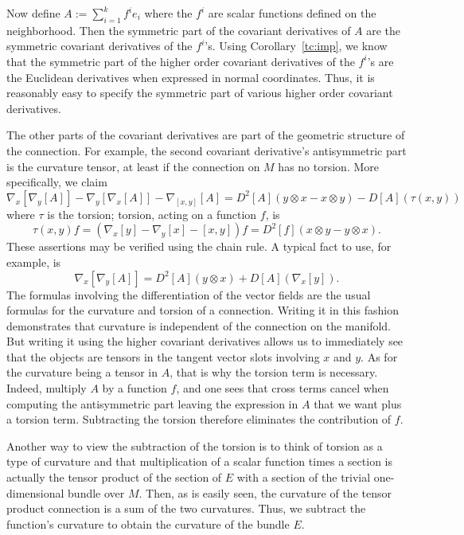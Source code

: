 \documentclass[11pt]{article}
\theoremstyle{remark}
\begin{document}
Now define $A := \sum_{i=1}^k f^i e_i$ where the $f^i$ are
scalar functions defined on the neighborhood. Then the symmetric part
of the covariant
derivatives of $A$ are the symmetric covariant derivatives of the $f^i$'s. 
Using Corollary~{\ref{tc:imp}}, we know that the symmetric part of the
higher order covariant derivatives of the $f^i$'s are  the
Euclidean derivatives when expressed in 
 normal coordinates. Thus, it is reasonably
easy to specify the symmetric part of various higher order covariant
derivatives. 

The other parts of the covariant derivatives are part of the geometric
structure of the connection. For example, the second covariant
derivative's antisymmetric part is the curvature tensor, at least if
the connection on $M$ has no torsion. More specifically, we claim
\[
\ensuremath{{{\nabla}}_{x}^{}{[\ensuremath{{{\nabla}}_{y}^{}{[A]}}{}]}} - \ensuremath{{{\nabla}}_{y}^{}{[\ensuremath{{{\nabla}}_{x}^{}{[A]}}{}]}}
- \ensuremath{{{\nabla}}_{[x,y]}^{}{[A]}} 
=
D^2[A] (y\otimes x -x \otimes y) - D[A] (\tau(x, y))
\]
where $\tau$ is the torsion; torsion, acting on a function $f$, is 
\[
\tau(x,y)f = (\ensuremath{{{\nabla}}_{x}^{}{[y]}} - \ensuremath{{{\nabla}}_{y}^{}{[x]}} -[x,y])f 
= D^2[f](x\otimes y -y \otimes x).
\]
These assertions may be verified using the chain rule. A typical fact
to use, for example, is
\[
\ensuremath{{{\nabla}}_{x}^{}{[\ensuremath{{{\nabla}}_{y}^{}{[A]}}{}]}} =  
D^2 [A] (y \otimes x) + D[A](\ensuremath{{{\nabla}}_{x}^{}{[y]}}).
\]
The formulas involving the differentiation of the vector fields are
the usual formulas for the curvature and torsion of a
connection. Writing it in this fashion demonstrates that curvature is
independent of the connection on the manifold. But writing it using
the higher covariant derivatives allows us to immediately see that the
objects are tensors in the tangent vector slots involving $x$ and
$y$. As for the curvature being a tensor in $A$, that is why the
torsion term is necessary. Indeed, multiply $A$ by a function $f$, and
one sees that cross terms cancel when computing the antisymmetric part
leaving the expression in $A$ that we want plus a torsion
term. Subtracting the torsion therefore eliminates the contribution of
$f$. 

Another way to view the subtraction of the torsion
 is to think of torsion as a type of
curvature and that multiplication of a scalar function times a section
is actually the tensor product of the section of $E$ with a section of
the trivial one-dimensional bundle over $M$. Then, as is easily seen,
the curvature of the tensor product connection  is a sum of the two
 curvatures. Thus, we subtract the function's curvature to obtain the
 curvature of the bundle $E$. 
\end{document}
